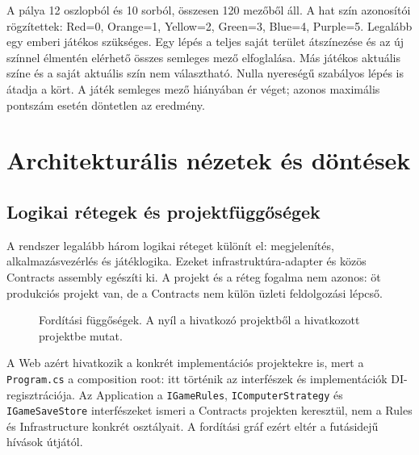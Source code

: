 \documentclass[11pt,a4paper]{article}
\newcommand{\code}[1]{\nolinkurl{#1}}
\begin{document}
A pálya 12 oszlopból és 10 sorból, összesen 120 mezőből áll. A hat szín azonosítói rögzítettek: Red=0, Orange=1, Yellow=2, Green=3, Blue=4, Purple=5. Legalább egy emberi játékos szükséges. Egy lépés a teljes saját terület átszínezése és az új színnel élmentén elérhető összes semleges mező elfoglalása. Más játékos aktuális színe és a saját aktuális szín nem választható. Nulla nyereségű szabályos lépés is átadja a kört. A játék semleges mező hiányában ér véget; azonos maximális pontszám esetén döntetlen az eredmény.

\section{Architekturális nézetek és döntések}
\subsection{Logikai rétegek és projektfüggőségek}
A rendszer legalább három logikai réteget különít el: megjelenítés, alkalmazásvezérlés és játéklogika. Ezeket infrastruktúra-adapter és közös Contracts assembly egészíti ki. A projekt és a réteg fogalma nem azonos: öt produkciós projekt van, de a Contracts nem külön üzleti feldolgozási lépcső.

\begin{figure}[htbp]\centering
{}
\caption{Fordítási függőségek. A nyíl a hivatkozó projektből a hivatkozott projektbe mutat.}
\label{fig:dependencies}
\end{figure}

A Web azért hivatkozik a konkrét implementációs projektekre is, mert a \code{Program.cs} a composition root: itt történik az interfészek és implementációk DI-regisztrációja. Az Application a \code{IGameRules}, \code{IComputerStrategy} és \code{IGameSaveStore} interfészeket ismeri a Contracts projekten keresztül, nem a Rules és Infrastructure konkrét osztályait. A fordítási gráf ezért eltér a futásidejű hívások útjától.
\end{document}
